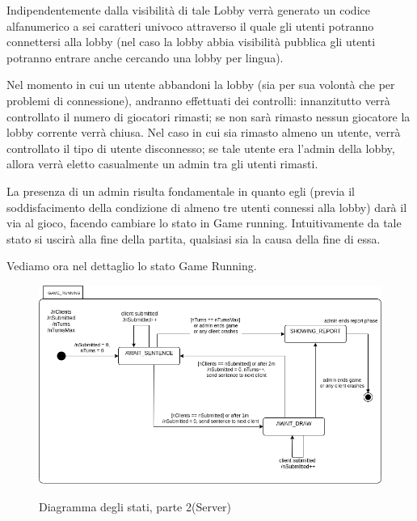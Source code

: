 \noindent Indipendentemente dalla visibilità di tale Lobby verrà generato un codice alfanumerico a sei caratteri univoco attraverso il quale gli utenti potranno connettersi alla lobby (nel caso la lobby abbia visibilità pubblica gli utenti potranno entrare anche cercando una lobby per lingua).\newline

\noindent Nel momento in cui un utente abbandoni la lobby (sia per sua volontà che per problemi di connessione), andranno effettuati dei controlli: innanzitutto verrà controllato il numero di giocatori rimasti; se non sarà rimasto nessun giocatore la lobby corrente verrà chiusa.\newline
Nel caso in cui sia rimasto almeno un utente, verrà controllato il tipo di utente disconnesso; se tale utente era l'admin della lobby, allora verrà eletto casualmente un admin tra gli utenti rimasti.\newline

\noindent La presenza di un admin risulta fondamentale in quanto egli (previa il soddisfacimento della condizione di almeno tre utenti connessi alla lobby) darà il via al gioco, facendo cambiare lo stato in Game running. Intuitivamente da tale stato si uscirà alla fine della partita, qualsiasi sia la causa della fine di essa.\newline

\noindent Vediamo ora nel dettaglio lo stato Game Running.

\begin{figure}[H]
    \caption{Diagramma degli stati, parte 2(Server)}
    \centering
    \includegraphics[width=150mm]{img/ingSoft/State Server Macro.png}
    \label{fig:server_state_2}
\end{figure}

